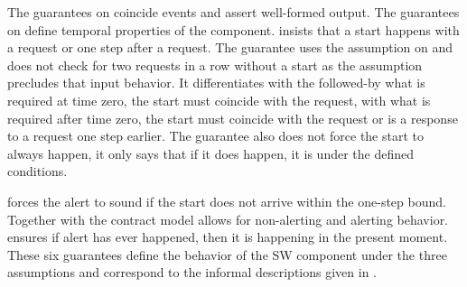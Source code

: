 The guarantees on  coincide events and assert well-formed output.
The guarantees on  define temporal properties of the component.
 insists that a start happens with a request or one step after a request.
The guarantee uses the assumption on  and does not check for two requests in a row without a start as the assumption precludes that input behavior.
It differentiates with the followed-by what is required at time zero, the start must coincide with the request, with what is required after time zero, the start must coincide with the request or is a response to a request one step earlier.
The guarantee also does not force the start to always happen, it only says that if it does happen, it is under the defined conditions.

 forces the alert to sound if the start does not arrive within the one-step bound.
Together with  the contract model allows for non-alerting and alerting behavior.
 ensures if alert has ever happened, then it is happening in the present moment.
These six guarantees define the behavior of the SW component under the three assumptions and correspond to the informal descriptions given in .
